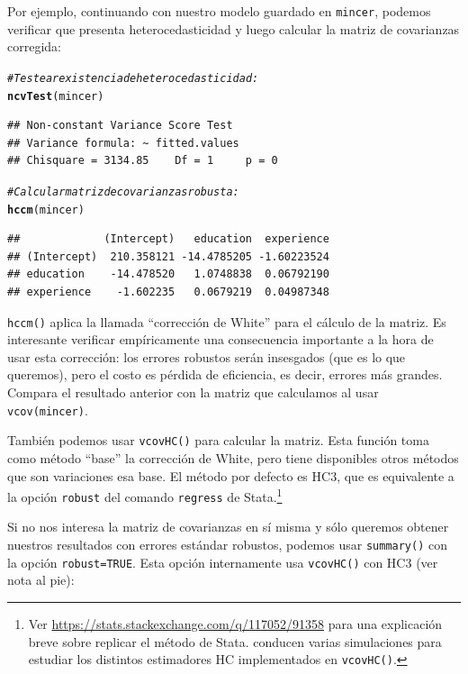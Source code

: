 \documentclass{article}\usepackage[]{graphicx}\usepackage[]{color}
\makeatletter
\newcommand{\hlcom}[1]{\textcolor[rgb]{0.678,0.584,0.686}{\textit{#1}}}%
\newcommand{\hlstd}[1]{\textcolor[rgb]{0.345,0.345,0.345}{#1}}%
\newcommand{\hlkwd}[1]{\textcolor[rgb]{0.737,0.353,0.396}{\textbf{#1}}}%
\newenvironment{kframe}{%
 \def\at@end@of@kframe{}%
 \ifinner\ifhmode%
  \def\at@end@of@kframe{\end{minipage}}%
  \begin{minipage}{\columnwidth}%
 \fi\fi%
 \def\FrameCommand##1{\hskip\@totalleftmargin \hskip-\fboxsep
 \colorbox{shadecolor}{##1}\hskip-\fboxsep
     \hskip-\linewidth \hskip-\@totalleftmargin \hskip\columnwidth}%
 \MakeFramed {\advance\hsize-\width
   \@totalleftmargin\z@ \linewidth\hsize
   \@setminipage}}%
 {\par\unskip\endMakeFramed%
 \at@end@of@kframe}
\newenvironment{knitrout}{}{} %
\makeatother
\begin{document}
Por ejemplo, continuando con nuestro modelo guardado en \verb|mincer|, podemos verificar que presenta heterocedasticidad y luego calcular la matriz de covarianzas corregida:

\begin{knitrout}
\color{fgcolor}\begin{kframe}
\begin{alltt}
\hlcom{# Testear existencia de heterocedasticidad:}
\hlkwd{ncvTest}\hlstd{(mincer)}
\end{alltt}
\begin{verbatim}
## Non-constant Variance Score Test 
## Variance formula: ~ fitted.values 
## Chisquare = 3134.85    Df = 1     p = 0
\end{verbatim}
\begin{alltt}
\hlcom{# Calcular matriz de covarianzas robusta:}
\hlkwd{hccm}\hlstd{(mincer)}
\end{alltt}
\begin{verbatim}
##             (Intercept)   education  experience
## (Intercept)  210.358121 -14.4785205 -1.60223524
## education    -14.478520   1.0748838  0.06792190
## experience    -1.602235   0.0679219  0.04987348
\end{verbatim}
\end{kframe}
\end{knitrout}

\verb|hccm()| aplica la llamada ``corrección de White'' para el cálculo de la matriz. 
Es interesante verificar empíricamente una consecuencia importante a la hora de usar esta corrección: los errores robustos serán insesgados (que es lo que queremos), pero el costo es pérdida de eficiencia, es decir, errores más grandes. Compara el resultado anterior con la matriz que calculamos al usar \verb|vcov(mincer)|.

También podemos usar \verb|vcovHC()| para calcular la matriz. Esta función toma como método ``base'' la corrección de White, pero tiene disponibles otros métodos que son variaciones esa base. El método por defecto es HC3, que es equivalente a la opción \verb|robust| del comando \verb|regress| de Stata.\footnote{Ver \url{https://stats.stackexchange.com/q/117052/91358} para una explicación breve sobre replicar el método de Stata. \textcite{long_using_2000} conducen varias simulaciones para estudiar los distintos estimadores HC implementados en \texttt{vcovHC()}.}

Si no nos interesa la matriz de covarianzas en sí misma y sólo queremos obtener nuestros resultados con errores estándar robustos, podemos usar \verb|summary()| con la opción \verb|robust=TRUE|. Esta opción internamente usa \verb|vcovHC()| con HC3 (ver nota al pie):
\end{document}
